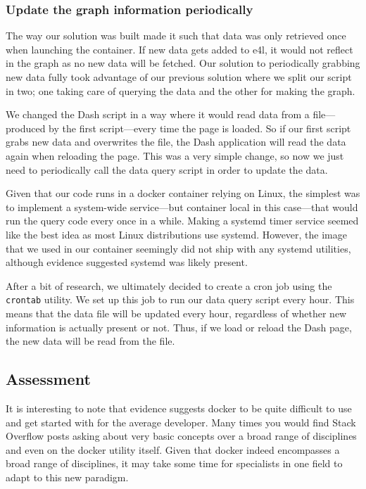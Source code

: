 \subsubsection{Update the graph information periodically}

The way our solution was built made it such that data was only
retrieved once when launching the container. If new data gets added to
\gls{e4l}, it would not reflect in the graph as no new data will be
fetched. Our solution to periodically grabbing new data fully took
advantage of our previous solution where we split our script in two;
one taking care of querying the data and the other for making the
graph.

We changed the Dash script in a way where it would read data from a
file---produced by the first script---every time the page is loaded.
So if our first script grabs new data and overwrites the file, the
Dash application will read the data again when reloading the page.
This was a very simple change, so now we just need to periodically
call the data query script in order to update the data.

Given that our code runs in a docker container relying on Linux, the
simplest was to implement a system-wide service---but container local
in this case---that would run the query code every once in a while.
Making a systemd timer service seemed like the best idea as most Linux
distributions use systemd. However, the image that we used in our
container seemingly did not ship with any systemd utilities, although
evidence suggested systemd was likely present.

After a bit of research, we ultimately decided to create a cron job
using the \verb|crontab| utility. We set up this job to run our data
query script every hour. This means that the data file will be updated
every hour, regardless of whether new information is actually present
or not. Thus, if we load or reload the Dash page, the new data will be
read from the file.

\subsection{Assessment}

It is interesting to note that evidence suggests docker to be quite
difficult to use and get started with for the average developer. Many
times you would find Stack Overflow posts asking about very basic
concepts over a broad range of disciplines and even on the docker
utility itself. \cite{docker-so} Given that docker indeed encompasses
a broad range of disciplines, it may take some time for specialists in
one field to adapt to this new paradigm.

